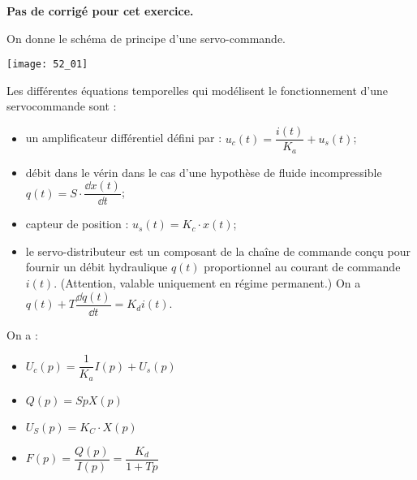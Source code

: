 \normaltrue \difficilefalse \tdifficilefalse
\correctionfalse


\setcounter{numques}{0}
\ifcorrection
\else
\textbf{Pas de corrigé pour cet exercice.}
\fi


\ifprof 
\else
On donne le schéma de principe d'une servo-commande.
\begin{center}
\texttt{[image: 52\_01]}
\end{center}

Les différentes équations temporelles qui modélisent le fonctionnement d'une servocommande sont :
\begin{itemize}
\item un amplificateur différentiel défini par : $u_c(t)=\dfrac{i(t)}{K_a}+u_s(t)$;
\item débit dans le vérin dans le cas d'une hypothèse de fluide incompressible $q(t)=S\cdot\dfrac{\dd x(t)}{\dd t}$;
\item capteur de position : $u_s(t)=K_c\cdot x(t)$;
\item le servo-distributeur est un composant de la chaîne de commande conçu pour fournir un débit hydraulique $q(t)$ proportionnel au courant de commande $i(t)$. (Attention, valable uniquement en régime permanent.) On a 
$q(t)+T \dfrac{\dd q(t)}{\dd t} = K_d i(t)$.

%
\end{itemize}
 \fi
 

\ifprof
On a :
\begin{itemize}
\item $U_c(p)=\dfrac{1}{K_a}I(p)+U_s(p)$
\item $Q(p)=SpX(p)$
\item $U_S(p)=K_C\cdot X(p)$
\item $F(p)=\dfrac{Q(p)}{I(p)}=\dfrac{K_d}{1+Tp}$
\end{itemize}

